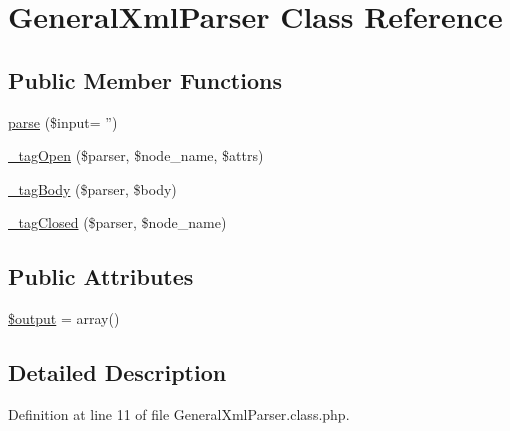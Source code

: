 \hypertarget{classGeneralXmlParser}{\section{General\+Xml\+Parser Class Reference}
\label{classGeneralXmlParser}
}
\subsection*{Public Member Functions}
\begin{DoxyCompactItemize}
\item 
\hyperlink{classGeneralXmlParser_a908eec0715e2c7470a18e149a092f300}{parse} (\$input= '')
\item 
\hyperlink{classGeneralXmlParser_a2921aab91afa276ce9f6c75cf483e80d}{\+\_\+tag\+Open} (\$parser, \$node\+\_\+name, \$attrs)
\item 
\hyperlink{classGeneralXmlParser_a78c57730ac9d216ba88c02eb2f3c2903}{\+\_\+tag\+Body} (\$parser, \$body)
\item 
\hyperlink{classGeneralXmlParser_a4609e66c695acd3f1a85450228f0b79b}{\+\_\+tag\+Closed} (\$parser, \$node\+\_\+name)
\end{DoxyCompactItemize}
\subsection*{Public Attributes}
\begin{DoxyCompactItemize}
\item 
\hyperlink{classGeneralXmlParser_a33ef1b950659188b06d8586c366f8fe2}{\$output} = array()
\end{DoxyCompactItemize}


\subsection{Detailed Description}


Definition at line 11 of file General\+Xml\+Parser.\+class.\+php.



